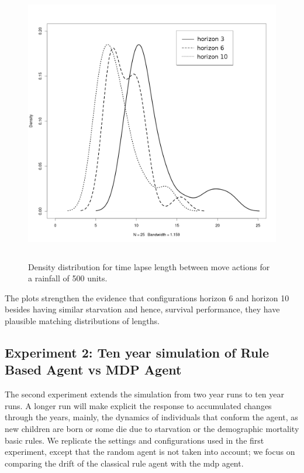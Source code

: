 \documentclass[11pt,oneside,a4paper,openright]{report}
\begin{document}
\begin{figure}[!htb]
\centering
\includegraphics[height=12.2cm]{figures/expm/segmLength_clim500_begin320}
\caption{Density distribution for time lapse length between move actions for a rainfall of 500 units.}
\label{fig:segmLength_clim500_begin320}
\end{figure}


The plots strengthen the evidence that configurations horizon 6 and horizon 10 besides having similar starvation and hence, survival performance, they have plausible matching distributions of lengths.


\subsection{Experiment 2: Ten year simulation of Rule Based Agent vs MDP Agent}
\label{sec:expEcsi2}
The second experiment extends the simulation from two year runs to ten year runs. 
A longer run will make explicit the response to accumulated changes through the years, mainly, the dynamics of individuals that conform the agent, as new children are born or some die due to starvation or the demographic mortality basic rules. 
We replicate the settings and configurations used in the first experiment, except that the random agent is not taken into account; we focus on comparing the drift of the classical rule agent with the mdp agent.
\end{document}
